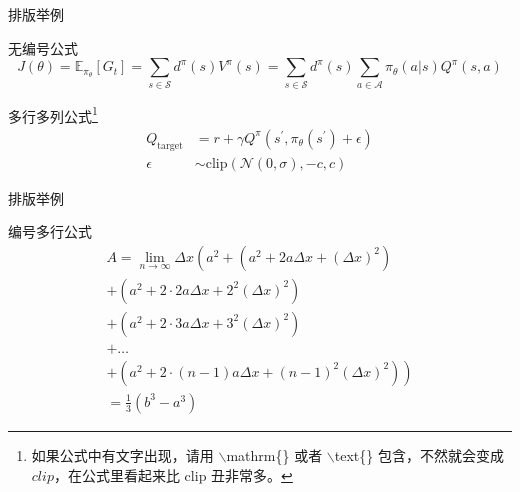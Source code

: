 \documentclass{beamer}
\begin{document}
\begin{frame}{排版举例}
    \begin{exampleblock}{无编号公式} %
        \begin{equation*}
            J(\theta) = \mathbb{E}_{\pi_\theta}[G_t] = \sum_{s\in\mathcal{S}} d^\pi (s)V^\pi(s)=\sum_{s\in\mathcal{S}} d^\pi(s)\sum_{a\in\mathcal{A}}\pi_\theta(a|s)Q^\pi(s,a)
        \end{equation*}
    \end{exampleblock}
    \begin{exampleblock}{多行多列公式\footnote{如果公式中有文字出现，请用 $\backslash$mathrm\{\} 或者 $\backslash$text\{\} 包含，不然就会变成 $clip$，在公式里看起来比 $\mathrm{clip}$ 丑非常多。}}
        \begin{align}
            Q_\mathrm{target}&=r+\gamma Q^\pi(s^\prime, \pi_\theta(s^\prime)+\epsilon)\\
            \epsilon&\sim\mathrm{clip}(\mathcal{N}(0, \sigma), -c, c)\nonumber
        \end{align}
    \end{exampleblock}
\end{frame}

\begin{frame}{排版举例}
    \begin{exampleblock}{编号多行公式}
        \begin{multline}
            A=\lim_{n\rightarrow\infty}\Delta x\left(a^{2}+\left(a^{2}+2a\Delta x+\left(\Delta x\right)^{2}\right)\right.\label{eq:reset}\\
            +\left(a^{2}+2\cdot2a\Delta x+2^{2}\left(\Delta x\right)^{2}\right)\\
            +\left(a^{2}+2\cdot3a\Delta x+3^{2}\left(\Delta x\right)^{2}\right)\\
            +\ldots\\
            \left.+\left(a^{2}+2\cdot(n-1)a\Delta x+(n-1)^{2}\left(\Delta x\right)^{2}\right)\right)\\
            =\frac{1}{3}\left(b^{3}-a^{3}\right)
        \end{multline}
    \end{exampleblock}
\end{frame}
\end{document}
